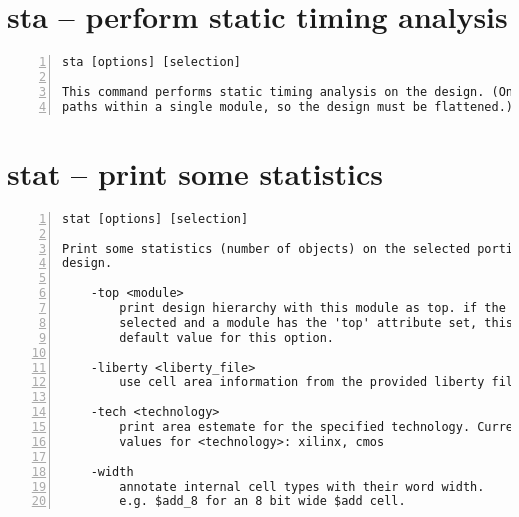 \section{sta -- perform static timing analysis}
\label{cmd:sta}
\begin{lstlisting}[numbers=left,frame=single]
    sta [options] [selection]

This command performs static timing analysis on the design. (Only considers
paths within a single module, so the design must be flattened.)
\end{lstlisting}

\section{stat -- print some statistics}
\label{cmd:stat}
\begin{lstlisting}[numbers=left,frame=single]
    stat [options] [selection]

Print some statistics (number of objects) on the selected portion of the
design.

    -top <module>
        print design hierarchy with this module as top. if the design is fully
        selected and a module has the 'top' attribute set, this module is used
        default value for this option.

    -liberty <liberty_file>
        use cell area information from the provided liberty file

    -tech <technology>
        print area estemate for the specified technology. Currently supported
        values for <technology>: xilinx, cmos

    -width
        annotate internal cell types with their word width.
        e.g. $add_8 for an 8 bit wide $add cell.
\end{lstlisting}

